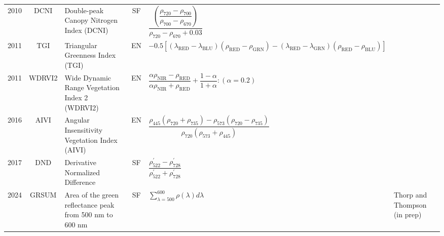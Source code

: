 \documentclass[10pt]{article}
\begin{document}
\begin{ThreePartTable}
\begin{longtable}{c c m{2.3in} c M{2.8in} M{1.5in}}
  2010 & DCNI    & Double-peak Canopy Nitrogen Index (DCNI)                                       & SF & $\dfrac{\left(\dfrac{\rho_{720}-\rho_{700}}{\rho_{700}-\rho_{670}}\right)}{\rho_{720}-\rho_{670}+0.03}$                                                                                                                                                                                 & \citet{Chen2010}                                    \\
  2011 & TGI     & Triangular Greenness Index (TGI)                                               & EN & $-0.5[(\lambda_\text{RED}-\lambda_\text{BLU})(\rho_\text{RED}-\rho_\text{GRN})-(\lambda_\text{RED}-\lambda_\text{GRN})(\rho_\text{RED}-\rho_\text{BLU})]$                                                                                                                               & \citet{Hunt2011}                                    \\
  2011 & WDRVI2  & Wide Dynamic Range Vegetation Index 2 (WDRVI2)                                 & EN & $\dfrac{\alpha\rho_\text{NIR}-\rho_\text{RED}}{\alpha\rho_\text{NIR}+\rho_\text{RED}}+\dfrac{1-\alpha}{1+\alpha} : (\alpha=0.2)$                                                                                                                                                        & \citet{Peng2011}                                    \\
  2016 & AIVI    & Angular Insensitivity Vegetation Index (AIVI)                                  & EN & $\dfrac{\rho_{445}(\rho_{720}+\rho_{735})-\rho_{573}(\rho_{720}-\rho_{735})}{\rho_{720}(\rho_{573}+\rho_{445})}$                                                                                                                                                                        & \citet{He2016}                                      \\
  2017 & DND     & Derivative Normalized Difference                                               & SF & $\dfrac{\rho^\prime_{522}-\rho^\prime_{728}}{\rho^\prime_{522}+\rho^\prime_{728}}$                                                                                                                                                                                                      & \citet{Sonobe2017}                                  \\
  2024 & GRSUM   & Area of the green reflectance peak from 500 nm to 600 nm                       & SF & $\sum\limits_{\lambda=500}^{600}\rho(\lambda)d\lambda$                                                                                                                                                                                                                                  & Thorp and Thompson (in prep)                        \\
\end{longtable}
\end{ThreePartTable}
\endgroup
\end{document}
